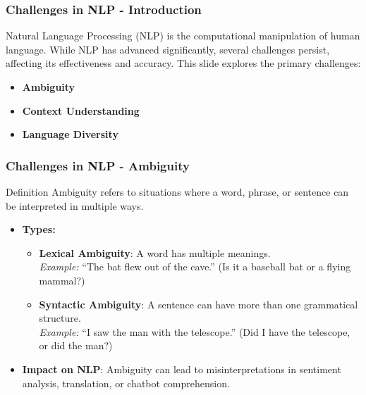 \documentclass[aspectratio=169]{beamer}
\begin{document}
\begin{frame}[fragile]
    \frametitle{Challenges in NLP - Introduction}
    Natural Language Processing (NLP) is the computational manipulation of human language. While NLP has advanced significantly, several challenges persist, affecting its effectiveness and accuracy. This slide explores the primary challenges:
    \begin{itemize}
        \item \textbf{Ambiguity}
        \item \textbf{Context Understanding}
        \item \textbf{Language Diversity}
    \end{itemize}
\end{frame}

\begin{frame}[fragile]
    \frametitle{Challenges in NLP - Ambiguity}
    \begin{block}{Definition}
        Ambiguity refers to situations where a word, phrase, or sentence can be interpreted in multiple ways.
    \end{block}

    \begin{itemize}
        \item \textbf{Types:}
        \begin{itemize}
            \item \textbf{Lexical Ambiguity}: A word has multiple meanings. \\
                  \textit{Example:} “The bat flew out of the cave.” (Is it a baseball bat or a flying mammal?)
            \item \textbf{Syntactic Ambiguity}: A sentence can have more than one grammatical structure. \\
                  \textit{Example:} “I saw the man with the telescope.” (Did I have the telescope, or did the man?)
        \end{itemize}
        \item \textbf{Impact on NLP}: Ambiguity can lead to misinterpretations in sentiment analysis, translation, or chatbot comprehension.
    \end{itemize}
\end{frame}
\end{document}
